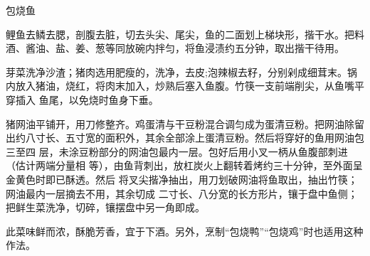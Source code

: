 \begin{recipe}{包烧鱼}

\ingredients


\preparation

\step 鲤鱼去鳞去腮，剖腹去脏，切去头尖、尾尖，鱼的二面划上梯块形，揩干水。把料
酒、酱油、盐、姜、葱等同放碗内拌匀，将鱼浸渍约五分钟，取出揩干待用。

\step 芽菜洗净沙渣；猪肉选用肥瘦的，洗净，去皮;泡辣椒去籽，分别剁成细茸末。锅
内放入猪油，烧红，将肉末加入，炒熟后塞入鱼腹。竹筷一支前端削尖，从鱼嘴平穿插入
鱼尾，以免烧时鱼身下垂。

\step 猪网油平铺开，用刀修整齐。鸡蛋清与干豆粉混合调匀成为蛋清豆粉。把网油除留
出约八寸长、五寸宽的面积外，其余全部涂上蛋清豆粉。然后将穿好的鱼用网油包三至四
层，未涂豆粉部分的网油包最内一层。包好后用小叉一柄从鱼腹部刺进（估计两端分量相
等），由鱼背刺出，放杠炭火上翻转着烤约三十分钟，至外面呈金黄色时即已酥透。然后
将叉尖揩净抽出，用刀划破网油将鱼取出，抽出竹筷；网油最内一层摘去不用，其余切成
二寸长、八分宽的长方形片，镶于盘中鱼侧；把鲜生菜洗净，切碎，镶摆盘中另一角即成。

\features

此菜味鲜而浓，酥脆芳香，宜于下酒。另外，烹制“包烧鸭”“包烧鸡”时也适用这种作法。

\end{recipe}

